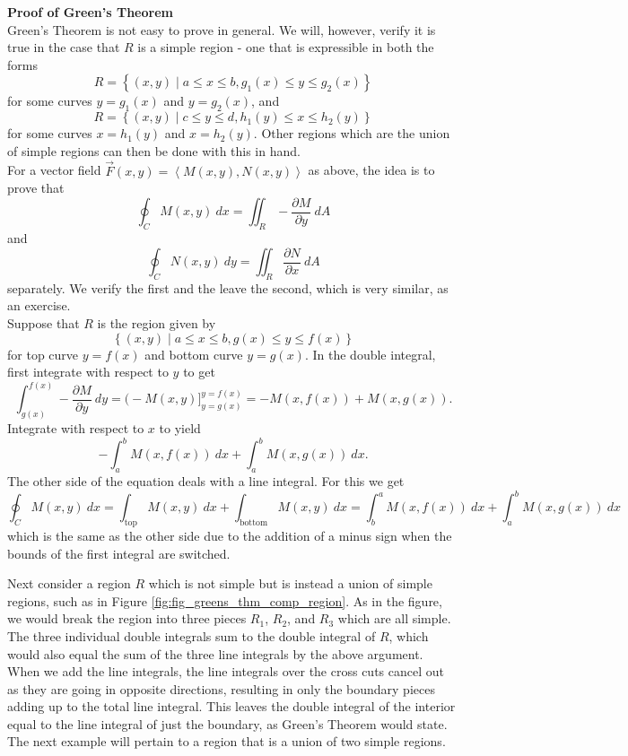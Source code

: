 \noindent\textbf{\large Proof of Green's Theorem}\\

Green's Theorem is not easy to prove in general.  We will, however, verify it is true in the case that $R$ is a simple region - one that is expressible in both the forms
$$R = \left\{ (x,y) \mid a \leq x \leq b, g_1(x) \leq y \leq g_2(x) \right\}$$
for some curves $y = g_1(x)$ and $y = g_2(x)$, and
$$R = \left\{ (x,y) \mid c \leq y \leq d, h_1(y) \leq x \leq h_2(y) \right\}$$
for some curves $x = h_1(y)$ and $x = h_2(y)$. Other regions which are the union of simple regions can then be done with this in hand.\\

For a vector field $\vec F(x,y) = \left< M(x,y) , N(x,y) \right>$ as above, the idea is to prove that
$$\oint_C M(x,y) \: dx = \iint_R -\dfrac{\partial M}{\partial y} \: dA$$
and
$$\oint_C N(x,y) \: dy = \iint_R \dfrac{\partial N}{\partial x} \: dA$$
separately. We verify the first and the leave the second, which is very similar, as an exercise.\\

Suppose that $R$ is the region given by
$$\left\{ (x,y) \mid a \leq x \leq b, g(x) \leq y \leq f(x) \right\}$$
for top curve $y = f(x)$ and bottom curve $y = g(x)$.  In the double integral, first integrate with respect to $y$ to get
$$\int_{g(x)}^{f(x)} -\dfrac{\partial M}{\partial y} \: dy = \Big( -M(x,y) \Big]_{y=g(x)}^{y=f(x)} = -M(x,f(x)) + M(x,g(x)).$$
Integrate with respect to $x$ to yield
$$-\int_a^b M(x,f(x)) \: dx + \int_a^b M(x,g(x)) \: dx.$$
The other side of the equation deals with a line integral. For this we get
$$\oint_C M(x,y) \: dx = \int_{\text{top}} M(x,y) \: dx + \int_{\text{bottom}} M(x,y) \: dx = \int_b^a M(x,f(x)) \: dx + \int_a^b M(x,g(x)) \: dx$$
which is the same as the other side due to the addition of a minus sign when the bounds of the first integral are switched.\\


Next consider a region $R$ which is not simple but is instead a union of simple regions, such as in Figure \ref{fig:fig_greens_thm_comp_region}. As in the figure, we would break the region into three pieces $R_1$, $R_2$, and $R_3$ which are all simple. The three individual double integrals sum to the double integral of $R$, which would also equal the sum of the three line integrals by the above argument. When we add the line integrals, the line integrals over the cross cuts cancel out as they are going in opposite directions, resulting in only the boundary pieces adding up to the total line integral.  This leaves the double integral of the interior equal to the line integral of just the boundary, as Green's Theorem would state. The next example will pertain to a region that is a union of two simple regions. \\

